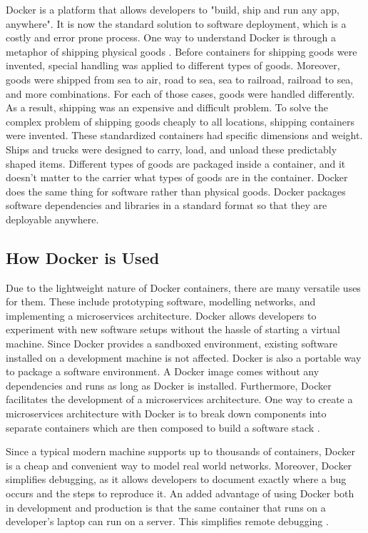 \documentclass[11pt]{article}
\begin{document}
Docker is a platform that allows developers to "build, ship and run any app, anywhere". It is now the standard solution to software deployment, which is a costly and error prone process. One way to understand Docker is through a metaphor of shipping physical goods \cite{miell}. Before containers for shipping goods were invented, special handling was applied to different types of goods. Moreover, goods were shipped from sea to air, road to sea, sea to railroad, railroad to sea, and more combinations. For each of those cases, goods were handled differently. As a result, shipping was an expensive and difficult problem. To solve the complex problem of shipping goods cheaply to all locations, shipping containers were invented. These standardized containers had specific dimensions and weight. Ships and trucks were designed to carry, load, and unload these predictably shaped items. Different types of goods are packaged inside a container, and it doesn’t matter to the carrier what types of goods are in the container. Docker does the same thing for software rather than physical goods. Docker packages software dependencies and libraries in a standard format so that they are deployable anywhere. 

\subsection{How Docker is Used}
Due to the lightweight nature of Docker containers, there are many versatile uses for them. These include prototyping software, modelling networks, and implementing a microservices architecture. Docker allows developers to experiment with new software setups without the hassle of starting a virtual machine. Since Docker provides a sandboxed environment, existing software installed on a development machine is not affected. Docker is also a portable way to package a software environment. A Docker image comes without any dependencies and runs as long as Docker is installed. Furthermore, Docker facilitates the development of a microservices architecture. One way to create a microservices architecture with Docker is to break down components into separate containers which are then composed to build a software stack \cite{miell}. 

Since a typical modern machine supports up to thousands of containers, Docker is a cheap and convenient way to model real world networks. Moreover, Docker simplifies debugging, as it allows developers to document exactly where a bug occurs and the steps to reproduce it. An added advantage of using Docker both in development and production is that the same container that runs on a developer’s laptop can run on a server. This simplifies remote debugging \cite{miell}. 
\end{document}
